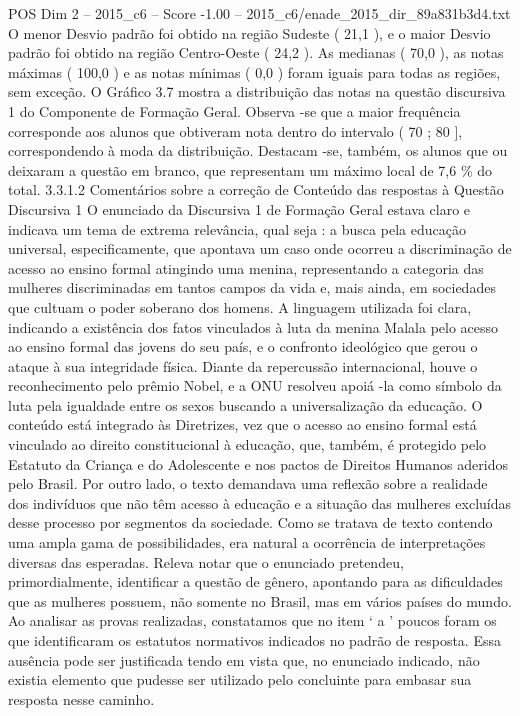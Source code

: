 \begin{textsample}{POS Dim 2 – 2015\_c6 – Score -1.00 – 2015\_c6/enade\_2015\_dir\_89a831b3d4.txt}
O menor Desvio padrão foi obtido na região Sudeste ( 21,1 ), e o maior Desvio padrão foi obtido na região Centro-Oeste ( 24,2 ).
As medianas ( 70,0 ), as notas máximas ( 100,0 ) e as notas mínimas ( 0,0 ) foram iguais para todas as regiões, sem exceção.
O Gráfico 3.7 mostra a distribuição das notas na questão discursiva 1 do Componente de Formação Geral.
Observa -se que a maior frequência corresponde aos alunos que obtiveram nota dentro do intervalo ( 70 ; 80 ], correspondendo à moda da distribuição.
Destacam -se, também, os alunos que ou deixaram a questão em branco, que representam um máximo local de 7,6 \% do total. 3.3.1.2 Comentários sobre a correção de Conteúdo das respostas à Questão Discursiva 1 O enunciado da Discursiva 1 de Formação Geral estava claro e indicava um tema de extrema relevância, qual seja : a busca pela educação universal, especificamente, que apontava um caso onde ocorreu a discriminação de acesso ao ensino formal atingindo uma menina, representando a categoria das mulheres discriminadas em tantos campos da vida e, mais ainda, em sociedades que cultuam o poder soberano dos homens.
A linguagem utilizada foi clara, indicando a existência dos fatos vinculados à luta da menina Malala pelo acesso ao ensino formal das jovens do seu país, e o confronto ideológico que gerou o ataque à sua integridade física.
Diante da repercussão internacional, houve o reconhecimento pelo prêmio Nobel, e a ONU resolveu apoiá -la como símbolo da luta pela igualdade entre os sexos buscando a universalização da educação.
O conteúdo está integrado às Diretrizes, vez que o acesso ao ensino formal está vinculado ao direito constitucional à educação, que, também, é protegido pelo Estatuto da Criança e do Adolescente e nos pactos de Direitos Humanos aderidos pelo Brasil.
Por outro lado, o texto demandava uma reflexão sobre a realidade dos indivíduos que não têm acesso à educação e a situação das mulheres excluídas desse processo por segmentos da sociedade.
Como se tratava de texto contendo uma ampla gama de possibilidades, era natural a ocorrência de interpretações diversas das esperadas.
Releva notar que o enunciado pretendeu, primordialmente, identificar a questão de gênero, apontando para as dificuldades que as mulheres possuem, não somente no Brasil, mas em vários países do mundo.
Ao analisar as provas realizadas, constatamos que no item ‘ a ’ poucos foram os que identificaram os estatutos normativos indicados no padrão de resposta.
Essa ausência pode ser justificada tendo em vista que, no enunciado indicado, não existia elemento que pudesse ser utilizado pelo concluinte para embasar sua resposta nesse caminho.

\end{textsample}
